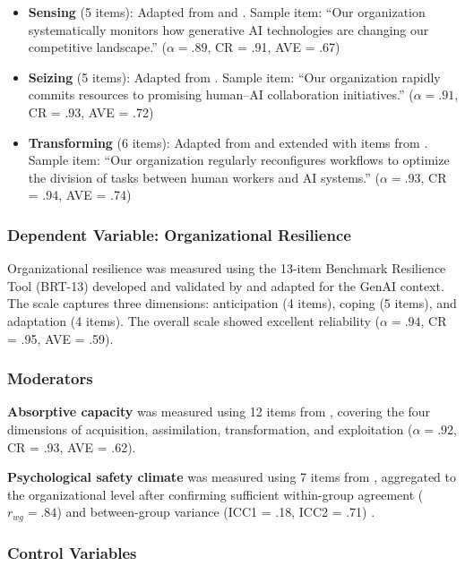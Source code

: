 \documentclass[12pt, a4paper]{article}
\begin{document}
\begin{itemize}[nosep]
    \item \textbf{Sensing} (5 items): Adapted from \citet{Pavlou2011} and \citet{Wilden2013}. Sample item: ``Our organization systematically monitors how generative AI technologies are changing our competitive landscape.'' ($\alpha = .89$, CR = .91, AVE = .67)
    \item \textbf{Seizing} (5 items): Adapted from \citet{Pavlou2011}. Sample item: ``Our organization rapidly commits resources to promising human--AI collaboration initiatives.'' ($\alpha = .91$, CR = .93, AVE = .72)
    \item \textbf{Transforming} (6 items): Adapted from \citet{Pavlou2011} and extended with items from \citet{Warner2019}. Sample item: ``Our organization regularly reconfigures workflows to optimize the division of tasks between human workers and AI systems.'' ($\alpha = .93$, CR = .94, AVE = .74)
\end{itemize}

\subsubsection{Dependent Variable: Organizational Resilience}

Organizational resilience was measured using the 13-item Benchmark Resilience Tool (BRT-13) developed and validated by \citet{Lee2013} and adapted for the GenAI context. The scale captures three dimensions: anticipation (4 items), coping (5 items), and adaptation (4 items). The overall scale showed excellent reliability ($\alpha = .94$, CR = .95, AVE = .59).

\subsubsection{Moderators}

\textbf{Absorptive capacity} was measured using 12 items from \citet{Flatten2011}, covering the four dimensions of acquisition, assimilation, transformation, and exploitation ($\alpha = .92$, CR = .93, AVE = .62).

\textbf{Psychological safety climate} was measured using 7 items from \citet{Edmondson1999}, aggregated to the organizational level after confirming sufficient within-group agreement ($r_{wg} = .84$) and between-group variance (ICC1 = .18, ICC2 = .71) \citep{LeBreton2008}.

\subsubsection{Control Variables}
\end{document}
